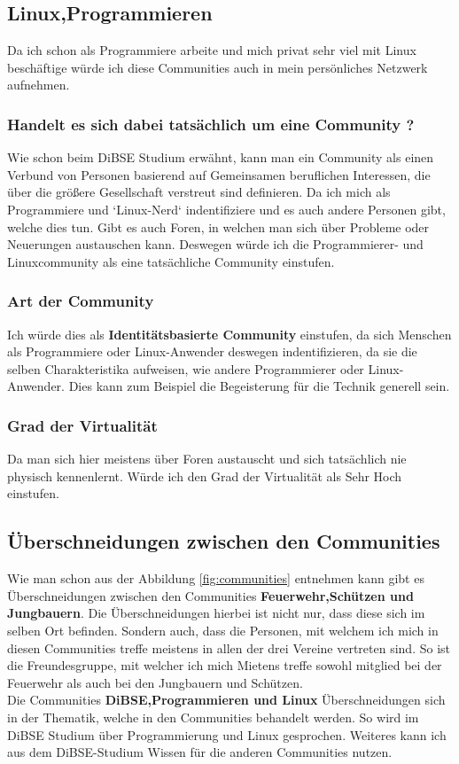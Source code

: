 \documentclass[12pt]{article}
\begin{document}
\subsection{Linux,Programmieren}
Da ich schon als Programmiere arbeite und mich privat sehr viel mit Linux beschäftige würde ich diese Communities auch in mein persönliches Netzwerk aufnehmen.
\subsubsection{Handelt es sich dabei tatsächlich um eine Community ?}
Wie schon beim DiBSE Studium erwähnt, kann man ein Community als einen Verbund von Personen basierend auf Gemeinsamen beruflichen Interessen, die über die größere Gesellschaft verstreut sind definieren. Da ich mich als Programmiere und `Linux-Nerd` indentifiziere und es auch andere Personen gibt, welche dies tun. Gibt es auch Foren, in welchen man sich über Probleme oder Neuerungen austauschen kann. Deswegen würde ich die Programmierer- und Linuxcommunity als eine tatsächliche Community einstufen.
\subsubsection{Art der Community}
Ich würde dies als \textbf{Identitätsbasierte Community} einstufen, da sich Menschen als Programmiere oder Linux-Anwender deswegen indentifizieren, da sie die selben Charakteristika aufweisen, wie andere Programmierer oder Linux-Anwender. Dies kann zum Beispiel die Begeisterung für die Technik generell sein.
\subsubsection{Grad der Virtualität}
Da man sich hier meistens über Foren austauscht und sich tatsächlich nie physisch kennenlernt. Würde ich den Grad der Virtualität als Sehr Hoch einstufen.
\subsection{Überschneidungen zwischen den Communities}
Wie man schon aus der Abbildung \ref{fig:communities} entnehmen kann gibt es Überschneidungen zwischen den Communities \textbf{Feuerwehr,Schützen und Jungbauern}. Die Überschneidungen hierbei ist nicht nur, dass diese sich im selben Ort befinden. Sondern auch, dass die Personen, mit welchem ich mich in diesen Communities treffe meistens in allen der drei Vereine vertreten sind. So ist die Freundesgruppe, mit welcher ich mich Mietens treffe sowohl mitglied bei der Feuerwehr als auch bei den Jungbauern und Schützen.\\
Die Communities \textbf{DiBSE,Programmieren und Linux} Überschneidungen sich in der Thematik, welche in den Communities behandelt werden. So wird im DiBSE Studium über Programmierung und Linux gesprochen. Weiteres kann ich aus dem DiBSE-Studium Wissen für die anderen Communities nutzen.
\pagebreak
\listoffigures
\lstlistoflistings
\end{document}
